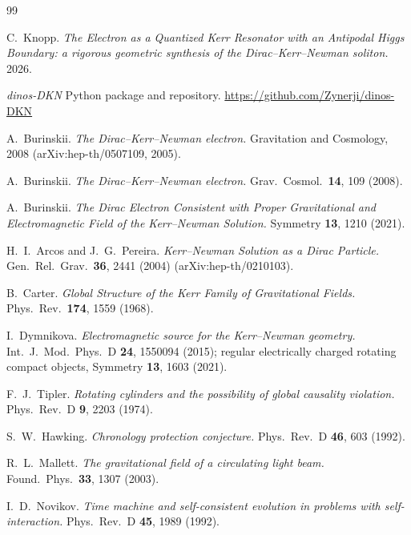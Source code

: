 \documentclass[11pt,a4paper]{article}
\theoremstyle{definition}
\theoremstyle{remark}
\begin{document}
\begin{thebibliography}{99}

 C.\ Knopp.
  \emph{The Electron as a Quantized Kerr Resonator with an Antipodal
  Higgs Boundary: a rigorous geometric synthesis of the
  Dirac--Kerr--Newman soliton.} 2026.

 \emph{dinos-DKN} Python package and repository.
  \url{https://github.com/Zynerji/dinos-DKN}

 A.\ Burinskii.
  \emph{The Dirac--Kerr--Newman electron.}
  Gravitation and Cosmology, 2008 (arXiv:hep-th/0507109, 2005).

 A.\ Burinskii.
  \emph{The Dirac--Kerr--Newman electron.}
  Grav.\ Cosmol.\ \textbf{14}, 109 (2008).

 A.\ Burinskii.
  \emph{The Dirac Electron Consistent with Proper Gravitational and
  Electromagnetic Field of the Kerr--Newman Solution.}
  Symmetry \textbf{13}, 1210 (2021).

 H.\ I.\ Arcos and J.\ G.\ Pereira.
  \emph{Kerr--Newman Solution as a Dirac Particle.}
  Gen.\ Rel.\ Grav.\ \textbf{36}, 2441 (2004) (arXiv:hep-th/0210103).

 B.\ Carter.
  \emph{Global Structure of the Kerr Family of Gravitational Fields.}
  Phys.\ Rev.\ \textbf{174}, 1559 (1968).

 I.\ Dymnikova.
  \emph{Electromagnetic source for the Kerr--Newman geometry.}
  Int.\ J.\ Mod.\ Phys.\ D \textbf{24}, 1550094 (2015); regular
  electrically charged rotating compact objects, Symmetry
  \textbf{13}, 1603 (2021).

 F.\ J.\ Tipler.
  \emph{Rotating cylinders and the possibility of global causality
  violation.} Phys.\ Rev.\ D \textbf{9}, 2203 (1974).

 S.\ W.\ Hawking.
  \emph{Chronology protection conjecture.}
  Phys.\ Rev.\ D \textbf{46}, 603 (1992).

 R.\ L.\ Mallett.
  \emph{The gravitational field of a circulating light beam.}
  Found.\ Phys.\ \textbf{33}, 1307 (2003).

 I.\ D.\ Novikov.
  \emph{Time machine and self-consistent evolution in problems with
  self-interaction.} Phys.\ Rev.\ D \textbf{45}, 1989 (1992).


\end{thebibliography}
\end{document}
